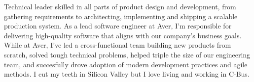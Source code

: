 

\begin{cvparagraph}

Technical leader skilled in all parts of product design and development, from gathering requirements to architecting, implementing and shipping a scalable production system.
As a lead software engineer at Aver, I'm responsible for delivering high-quality software that aligns with our company's business goals.
While at Aver, I've led a cross-functional team building new products from scratch, solved tough technical problems, helped triple the size of our engineering team, and succesfully drove adoption of modern development practices and agile methods.
I cut my teeth in Silicon Valley but I love living and working in C-Bus.

\end{cvparagraph}
